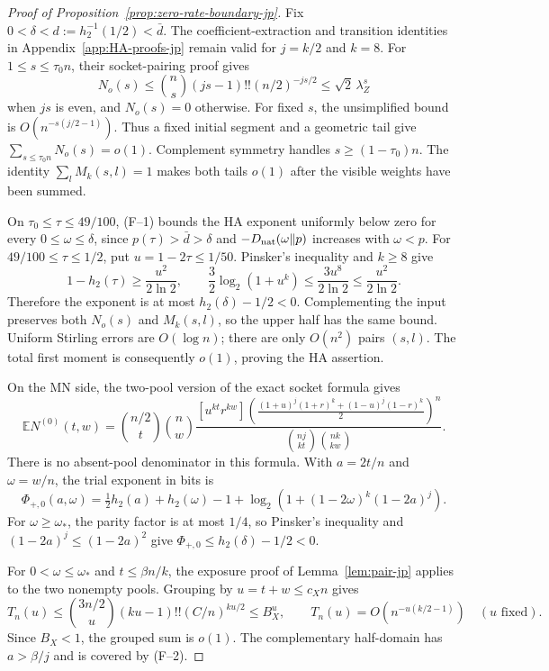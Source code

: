 \documentclass[11pt]{article}
\theoremstyle{definition}
\newcommand{\EE}{\mathbb E}
\newcommand{\h}{h_2}
\begin{document}
\begin{proof}[Proof of Proposition~\ref{prop:zero-rate-boundary-jp}]
Fix \(0<\delta<d:=\h^{-1}(1/2)<\bar d\).
The coefficient-extraction and transition identities in
Appendix~\ref{app:HA-proofs-jp} remain valid for \(j=k/2\) and \(k=8\).
For \(1\le s\le\tau_0n\), their socket-pairing proof gives
\[
N_o(s)\le\binom ns(js-1)!!(n/2)^{-js/2}
\le\sqrt2\,\lambda_Z^s
\]
when \(js\) is even, and \(N_o(s)=0\) otherwise. For fixed \(s\),
the unsimplified bound is \(O(n^{-s(j/2-1)})\). Thus a fixed initial
segment and a geometric tail give \(\sum_{s\le\tau_0n}N_o(s)=o(1)\).
Complement symmetry handles \(s\ge(1-\tau_0)n\). The identity
\(\sum_lM_k(s,l)=1\) makes both tails \(o(1)\) after the visible
weights have been summed.

On \(\tau_0\le\tau\le49/100\), (F--1) bounds the HA exponent
uniformly below zero for every \(0\le\omega\le\delta\), since
\(p(\tau)>\bar d>\delta\) and \(-D_{\rm nat}(\omega\|p)\) increases
with \(\omega<p\). For \(49/100\le\tau\le1/2\), put
\(u=1-2\tau\le1/50\). Pinsker's inequality and \(k\ge8\) give
\[
1-\h(\tau)\ge\frac{u^2}{2\ln2},\qquad
\frac32\log_2(1+u^k)\le\frac{3u^8}{2\ln2}
\le\frac{u^2}{2\ln2}.
\]
Therefore the exponent is at most \(\h(\delta)-1/2<0\).
Complementing the input preserves both \(N_o(s)\) and \(M_k(s,l)\),
so the upper half has the same bound. Uniform Stirling errors are
\(O(\log n)\); there are only \(O(n^2)\) pairs \((s,l)\).
The total first moment is consequently \(o(1)\), proving the HA assertion.

On the MN side, the two-pool version of the exact socket formula gives
\[
\EE N^{(0)}(t,w)=\binom{n/2}{t}\binom nw
\frac{[u^{kt}r^{kw}]
\left(\frac{(1+u)^j(1+r)^k+(1-u)^j(1-r)^k}{2}\right)^n}
{\binom{nj}{kt}\binom{nk}{kw}}.
\]
There is no absent-pool denominator in this formula. With
\(a=2t/n\) and \(\omega=w/n\), the trial exponent in bits is
\[
\Phi_{+,0}(a,\omega)=\tfrac12\h(a)+\h(\omega)-1+
\log_2(1+(1-2\omega)^k(1-2a)^j).
\]
For \(\omega\ge\omega_*\), the parity factor is at most \(1/4\),
so Pinsker's inequality and \((1-2a)^j\le(1-2a)^2\) give
\(\Phi_{+,0}\le\h(\delta)-1/2<0\).

For \(0<\omega\le\omega_*\) and \(t\le\beta n/k\), the exposure
proof of Lemma~\ref{lem:pair-jp} applies to the two nonempty pools.
Grouping by \(u=t+w\le c_Xn\) gives
\[
T_n(u)\le\binom{3n/2}{u}(ku-1)!!(C/n)^{ku/2}
\le B_X^u,
\qquad
T_n(u)=O(n^{-u(k/2-1)})\quad(u\text{ fixed}).
\]
Since \(B_X<1\), the grouped sum is \(o(1)\). The complementary
half-domain has \(a>\beta/j\) and is covered by (F--2).


\end{proof}
\end{document}
